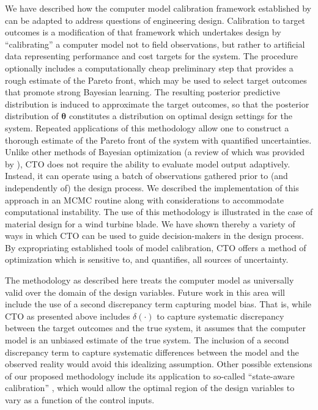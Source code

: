 \documentclass[12pt]{article}
\begin{document}
We have described how the 
computer model calibration framework established by \cite{Kennedy2001} can be adapted to address questions of engineering design. 
%
Calibration to target outcomes is a modification of that framework which undertakes design by ``calibrating'' a computer model not to field observations, but rather to artificial data representing performance and cost targets for the system. 
%
The procedure optionally includes a computationally cheap preliminary step that provides a rough estimate of the Pareto front, which may be used to select target outcomes that promote strong Bayesian learning.
%
The resulting posterior predictive distribution is induced to approximate the target outcomes, so that the posterior distribution of $\boldsymbol\theta$ constitutes a distribution on optimal design settings for the system.
%
Repeated applications of this methodology allow one to construct a thorough estimate of the Pareto front of the system with quantified uncertainties.
%
Unlike other methods of Bayesian optimization (a review of which was provided by \citealt{Shahriari2016}), CTO does not require the ability to evaluate model output adaptively.
%
Instead, it can operate using a batch of observations gathered prior to (and independently of) the design process.
%
We described the implementation of this approach in an MCMC routine along with considerations to accommodate computational instability.
%
The use of this methodology is illustrated in the case of material design for a wind turbine blade. 
%
We have shown thereby a variety of ways in which CTO can be used to guide decision-makers in the design process. 
%
By expropriating established tools of model calibration, CTO offers a method of optimization which is sensitive to, and quantifies, all sources of uncertainty.
%

%
The methodology as described here treats the computer model as universally valid over the domain of the design variables. 
%
Future work in this area will include the use of a second discrepancy term capturing model bias.
%
That is, while CTO as presented above includes $\delta(\cdot)$ to capture systematic discrepancy between the target outcomes and the true system, it assumes that the computer model is an unbiased estimate of the true system.
%
The inclusion of a second discrepancy term to capture systematic differences between the model and the observed reality would avoid this idealizing assumption.
%
Other possible extensions of our proposed methodology include its application to so-called ``state-aware calibration'' \citep{Atamturktur2015,Stevens2018,Brown2016}, which would allow the optimal region of the design variables to vary as a function of the control inputs.
\end{document}
